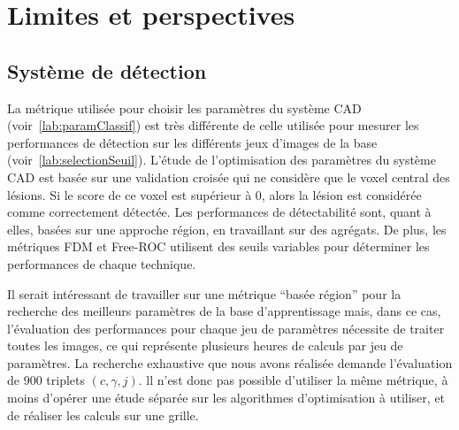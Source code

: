 % 
% 
% 

\section{Limites et perspectives}


\subsection{Système de détection}

La métrique utilisée pour choisir les paramètres du système CAD
(voir~\ref{lab:paramClassif}) est très différente de celle utilisée pour
mesurer les performances de détection sur les différents jeux d'images de la base
(voir~\ref{lab:selectionSeuil}). L'étude de l'optimisation des paramètres du
système CAD est basée sur une validation croisée qui ne considère que le
voxel central des lésions. Si le score de ce voxel est supérieur à 0,
alors la lésion est considérée comme correctement détectée. Les
performances de détectabilité sont, quant à elles, basées sur une approche
région, en travaillant sur des agrégats. De plus, les métriques FDM et
Free-ROC utilisent des seuils variables pour déterminer les performances de chaque
technique. 

Il serait intéressant de travailler sur une métrique ``basée région'' pour la
recherche des meilleurs paramètres de la base d'apprentissage mais, dans ce cas,
l'évaluation des performances pour chaque jeu de paramètres nécessite de traiter
toutes les images, ce qui représente plusieurs heures de calculs par jeu de
paramètres. La recherche exhaustive que nous avons réalisée demande l'évaluation
de 900 triplets $(c, \gamma, j)$. ll n'est donc pas possible d'utiliser la même
métrique, à moins d'opérer une étude séparée sur les algorithmes d'optimisation à utiliser, et de
réaliser les calculs sur une grille. 


